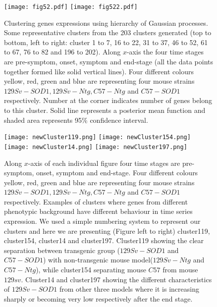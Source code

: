 \begin{figure}
 \begin{center}
    \texttt{[image: fig52.pdf]}
    \texttt{[image: fig522.pdf]}
    \caption [Clustering genes expressions using hierarchy of Gaussian processes] 
    {Clustering genes expressions using hierarchy of Gaussian processes. Some representative clusters from the 203 clusters generated (top to bottom, left to right: cluster 1 to 7, 16 to 22, 31 to 37, 46 to 52, 61 to 67, 76 to 82 and 196 to 202). Along $x$-axis the four time stages are pre-symptom, onset, symptom and end-stage (all the data points together formed like solid vertical lines). Four different colours yellow, red, green and blue are representing four mouse strains $129Sv-SOD1, 129Sv-Ntg, C57-Ntg$ and $C57-SOD1$ respectively. Number at the corner indicates number of genes belong to this cluster. Solid line represents a posterior mean function and shaded area represents 95\% confidence interval.\label{fig:fewClusters}}
 \end{center}
\end{figure}

\begin{figure}
 \begin{center}
 \texttt{[image: newCluster119.png]}
 \texttt{[image: newCluster154.png]}
 \texttt{[image: newCluster14.png]}
 \texttt{[image: newCluster197.png]}
  \caption [Few examples of clusters with different dynamics]
    {Along $x$-axis of each individual figure four time stages are pre-symptom, onset, symptom and end-stage. Four different colours yellow, red, green and blue are representing four mouse strains $129Sv-SOD1, 129Sv-Ntg, C57-Ntg$ and $C57-SOD1$ respectively. Examples of clusters where genes from different phenotypic background have different behaviour in time series expression. We used a simple numbering system to represent our clusters and here we are presenting (Figure left to  right) cluster119, cluster154, cluster14 and cluster197. Cluster119 showing the clear separation between transgenic group ($129Sv-SOD1$ and $C57-SOD1$) with non-transgenic mouse model($129Sv-Ntg$ and $C57-Ntg$), while cluster154 separating mouse $C57$ from mouse $129sv$. Cluster14 and cluster197 showing the different characteristics of $129Sv-SOD1$ from other three models where it is increasing sharply or becoming very low respectively after the end stage. \label{fig:fourSampleClusters}}
 \end{center}
\end{figure}



